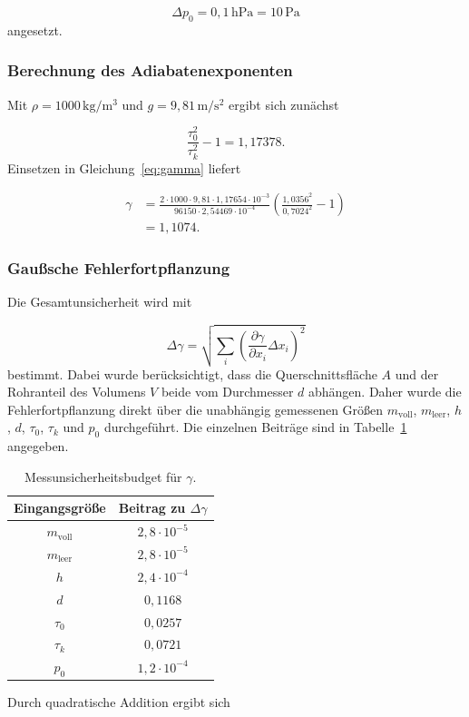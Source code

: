 \documentclass{report}
\begin{document}
\begin{equation}
\Delta p_0=0{,}1\,\mathrm{hPa}=10\,\mathrm{Pa}
\end{equation}
\noindent
angesetzt.


\subsubsection{Berechnung des Adiabatenexponenten}

Mit $\rho=1000\,\mathrm{kg/m^3}$ und
$g=9{,}81\,\mathrm{m/s^2}$ ergibt sich zunächst

\begin{equation}
\frac{\tau_0^2}{\tau_k^2}-1
=
1{,}17378.
\end{equation}
\noindent
Einsetzen in Gleichung~\ref{eq:gamma} liefert

\begin{align}
\gamma
&=
\frac{
2\cdot1000\cdot9{,}81
\cdot1{,}17654\cdot10^{-3}
}{
96150\cdot2{,}54469\cdot10^{-4}
}
\left(
\frac{1{,}0356^2}{0{,}7024^2}-1
\right)\\
&=
1{,}1074.
\end{align}


\subsubsection{Gaußsche Fehlerfortpflanzung}
\noindent
Die Gesamtunsicherheit wird mit

\begin{equation}
\Delta\gamma
=
\sqrt{
\sum_i
\left(
\frac{\partial\gamma}{\partial x_i}
\Delta x_i
\right)^2
}
\end{equation}
\noindent
bestimmt.
\noindent
Dabei wurde berücksichtigt, dass die Querschnittsfläche $A$ und der Rohranteil
des Volumens $V$ beide vom Durchmesser $d$ abhängen. Daher wurde die
Fehlerfortpflanzung direkt über die unabhängig gemessenen Größen
$m_\mathrm{voll}$, $m_\mathrm{leer}$, $h$, $d$, $\tau_0$, $\tau_k$ und $p_0$
durchgeführt.
\noindent
Die einzelnen Beiträge sind in Tabelle~\ref{tab:budget_gamma} angegeben.

\begin{table}[htbp]
    \centering
    \caption{Messunsicherheitsbudget für $\gamma$.}
    \label{tab:budget_gamma}
    \begin{tabular}{c|c}
        \hline
        Eingangsgröße & Beitrag zu $\Delta\gamma$\\
        \hline
        $m_\mathrm{voll}$ & $2{,}8\cdot10^{-5}$\\
        $m_\mathrm{leer}$ & $2{,}8\cdot10^{-5}$\\
        $h$               & $2{,}4\cdot10^{-4}$\\
        $d$               & $0{,}1168$\\
        $\tau_0$          & $0{,}0257$\\
        $\tau_k$          & $0{,}0721$\\
        $p_0$             & $1{,}2\cdot10^{-4}$\\
        \hline
    \end{tabular}
\end{table}
\noindent
Durch quadratische Addition ergibt sich
\end{document}
